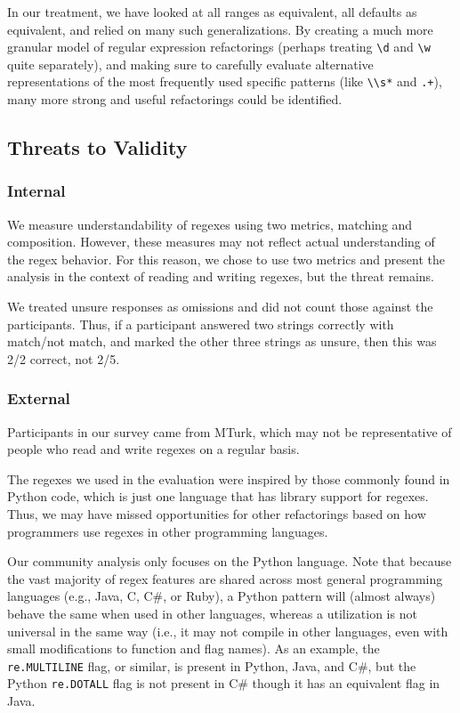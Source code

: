 In our treatment, we have looked at all ranges as equivalent, all defaults as equivalent, and relied on many such generalizations.  By creating a much more granular model of regular expression refactorings (perhaps treating \verb!\d! and \verb!\w! quite separately), and making sure to carefully evaluate alternative representations of the most frequently used specific patterns (like \verb!\\s*! and \verb!.+!), many more strong and useful refactorings could be identified.



\subsection{Threats to Validity}

\subsubsection{Internal}
We measure understandability of regexes using two metrics, matching and composition. However, these measures may not reflect actual understanding of the regex behavior. For this reason, we chose to use two metrics and present the analysis in the context of reading and writing regexes, but the threat remains.


We treated unsure responses as omissions and did not count those against the participants. Thus, if a participant answered two strings correctly with match/not match, and marked the other three strings as unsure, then this was 2/2 correct, not 2/5.

\subsubsection{External}
Participants in our survey came from MTurk, which may not be representative of people who read and write regexes on a regular basis.

The regexes we used in the evaluation were inspired by those commonly found in Python code, which is just one language that has library support for regexes. Thus, we may have missed opportunities for other refactorings based on how programmers use regexes in other programming languages.

Our community analysis only focuses on the Python language. Note that because the vast majority of regex features are shared across most general programming languages (e.g., Java, C, C\#, or Ruby), a Python {pattern} will (almost always) behave the same when used in other languages, whereas a utilization is not universal in the same way (i.e., it may not compile in other languages, even with small modifications to function and flag names).
As an example, the {\tt re.MULTILINE} flag, or similar, is present in Python, Java, and C\#, but  the Python {\tt re.DOTALL} flag is not present in C\# though it has an equivalent flag in Java.

